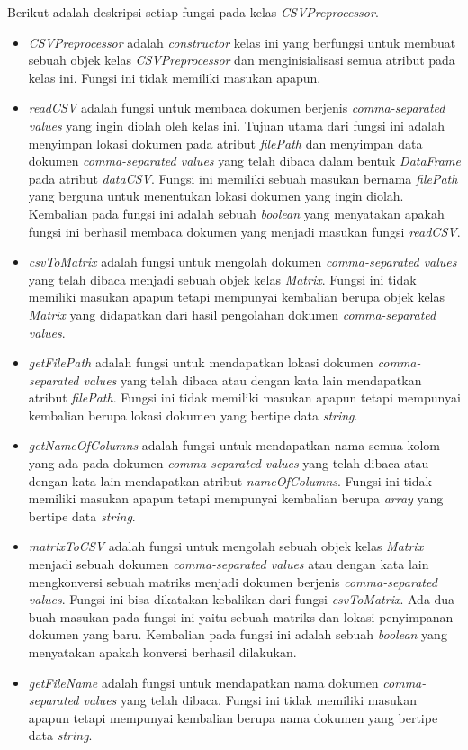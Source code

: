 Berikut adalah deskripsi setiap fungsi pada kelas \textit{CSVPreprocessor}.
\begin{itemize}
	\item \textit{CSVPreprocessor} adalah \textit{constructor} kelas ini yang berfungsi untuk membuat sebuah objek kelas \textit{CSVPreprocessor} dan menginisialisasi semua atribut pada kelas ini. Fungsi ini tidak memiliki masukan apapun.
	\item \textit{readCSV} adalah fungsi untuk membaca dokumen berjenis \textit{comma-separated values} yang ingin diolah oleh kelas ini. Tujuan utama dari fungsi ini adalah menyimpan lokasi dokumen pada atribut \textit{filePath} dan menyimpan data dokumen \textit{comma-separated values} yang telah dibaca dalam bentuk \textit{DataFrame} pada atribut \textit{dataCSV}. Fungsi ini memiliki sebuah masukan bernama \textit{filePath} yang berguna untuk menentukan lokasi dokumen yang ingin diolah. Kembalian pada fungsi ini adalah sebuah \textit{boolean} yang menyatakan apakah fungsi ini berhasil membaca dokumen yang menjadi masukan fungsi \textit{readCSV}.
	\item \textit{csvToMatrix} adalah fungsi untuk mengolah dokumen \textit{comma-separated values} yang telah dibaca menjadi sebuah objek kelas \textit{Matrix}. Fungsi ini tidak memiliki masukan apapun tetapi mempunyai kembalian berupa objek kelas \textit{Matrix} yang didapatkan dari hasil pengolahan dokumen \textit{comma-separated values}.
	\item \textit{getFilePath} adalah fungsi untuk mendapatkan lokasi dokumen \textit{comma-separated values} yang telah dibaca atau dengan kata lain mendapatkan atribut \textit{filePath}. Fungsi ini tidak memiliki masukan apapun tetapi mempunyai kembalian berupa lokasi dokumen yang bertipe data \textit{string}.
	\item \textit{getNameOfColumns} adalah fungsi untuk mendapatkan nama semua kolom yang ada pada dokumen \textit{comma-separated values} yang telah dibaca atau dengan kata lain mendapatkan atribut \textit{nameOfColumns}. Fungsi ini tidak memiliki masukan apapun tetapi mempunyai kembalian berupa \textit{array} yang bertipe data \textit{string}.
	\item \textit{matrixToCSV} adalah fungsi untuk mengolah sebuah objek kelas \textit{Matrix} menjadi sebuah dokumen \textit{comma-separated values} atau dengan kata lain mengkonversi sebuah matriks menjadi dokumen berjenis \textit{comma-separated values}. Fungsi ini bisa dikatakan kebalikan dari fungsi \textit{csvToMatrix}. Ada dua buah masukan pada fungsi ini yaitu sebuah matriks dan lokasi penyimpanan dokumen yang baru. Kembalian pada fungsi ini adalah sebuah \textit{boolean} yang menyatakan apakah konversi berhasil dilakukan.
	\item \textit{getFileName} adalah fungsi untuk mendapatkan nama dokumen \textit{comma-separated values} yang telah dibaca. Fungsi ini tidak memiliki masukan apapun tetapi mempunyai kembalian berupa nama dokumen yang bertipe data \textit{string}.
\end{itemize}

